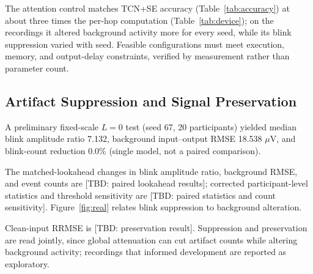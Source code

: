 \documentclass[letterpaper,journal]{IEEEtran}
\newcommand{\TBD}[1]{\textcolor{blue!65!black}{\textnormal{[TBD: #1]}}}
\begin{document}
The attention control matches TCN+SE accuracy (Table~\ref{tab:accuracy}) at about three times the per-hop computation (Table~\ref{tab:device}); on the recordings it altered background activity more for every seed, while its blink suppression varied with seed.
Feasible configurations must meet execution, memory, and output-delay constraints, verified by measurement rather than parameter count.

\subsection{Artifact Suppression and Signal Preservation}
A preliminary fixed-scale $L=0$ test (seed 67, 20 participants) yielded median blink amplitude ratio 7.132, background input--output RMSE 18.538 $\mu$V, and blink-count reduction 0.0\% (single model, not a paired comparison).

The matched-lookahead changes in blink amplitude ratio, background RMSE, and event counts are \TBD{paired lookahead results}; corrected participant-level statistics and threshold sensitivity are \TBD{paired statistics and count sensitivity}. Figure~\ref{fig:real} relates blink suppression to background alteration.

Clean-input RRMSE is \TBD{preservation result}. Suppression and preservation are read jointly, since global attenuation can cut artifact counts while altering background activity; recordings that informed development are reported as exploratory.
\end{document}
